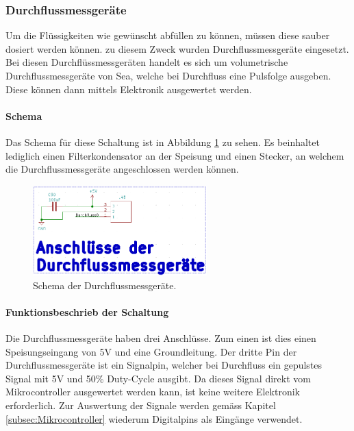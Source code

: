 \subsubsection{Durchflussmessgeräte}
\label{subsubsec:Durchflussmessgeräte}

Um die Flüssigkeiten wie gewünscht abfüllen zu können, müssen diese sauber dosiert werden können. zu diesem Zweck wurden Durchflussmessgeräte eingesetzt. Bei diesen Durchflüssmessgeräten handelt es sich um volumetrische Durchflussmessgeräte von Sea, welche bei Durchfluss eine Pulsfolge ausgeben. Diese können dann mittels Elektronik ausgewertet werden. \cite{five__tools_store_us_nodate}

\paragraph{Schema}\mbox{}

Das Schema für diese Schaltung ist in Abbildung \ref{fig:Schema_Durchflussmessgeräte} zu sehen. Es beinhaltet lediglich einen Filterkondensator an der Speisung und einen Stecker, an welchem die Durchflussmessgeräte angeschlossen werden können.

\begin{figure}[h!]
	\centering
	\includegraphics[width=0.6\textwidth]{graphics/Schema_Durchflussmessgeraete.png}
	\caption{Schema der Durchflussmessgeräte.}
	\label{fig:Schema_Durchflussmessgeräte}
\end{figure}

\paragraph{Funktionsbeschrieb der Schaltung}\mbox{}

Die Durchflussmessgeräte haben drei Anschlüsse. Zum einen ist dies einen Speisungseingang von 5V und eine Groundleitung. Der dritte Pin der Durchflussmessgeräte ist ein Signalpin, welcher bei Durchfluss ein gepulstes Signal mit 5V und 50\% Duty-Cycle ausgibt. Da dieses Signal direkt vom Mikrocontroller ausgewertet werden kann, ist keine weitere Elektronik erforderlich. Zur Auswertung der Signale werden gemäss Kapitel \ref{subsec:Mikrocontroller} wiederum Digitalpins als Eingänge verwendet. \cite{five__tools_store_us_nodate}  